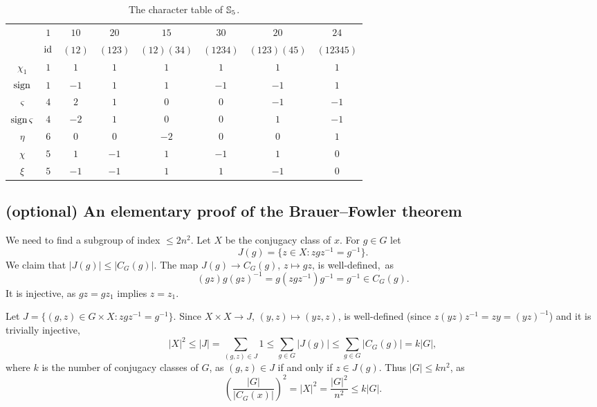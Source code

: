 \begin{table}[h]
    \caption{The character table of $\mathbb{S}_5$.}
    \begin{tabular}{|c|ccccccc|}
        \hline 
        & $1$ & $10$ & $20$ & $15$ & $30$ & $20$ & $24$ \\
        & $\operatorname{id}$ & $(12)$ & $(123)$ & $(12)(34)$ & $(1234)$ & $(123)(45)$  & $(12345)$ \\
        \hline 
        $\chi_1$ & $1$ & $1$ & $1$ & $1$ & $1$ & $1$ & $1$ \\
        $\operatorname{sign}$ & $1$ & $-1$ & $1$ & $1$ & $-1$ & $-1$ & $1$ \\
        $\varsigma$ & $4$ & $2$ & $1$ & $0$ & $0$ & $-1$ & $-1$ \\
        $\operatorname{sign}\varsigma$ & $4$ & $-2$ & $1$ & $0$ & $0$ & $1$ & $-1$ \\
        $\eta$ & $6$ & $0$ & $0$ & $-2$ & $0$ & $0$ & $1$ \\
        $\chi$ & $5$ & $1$ & $-1$ & $1$ & $-1$ & $1$ & $0$ \\
        $\xi$ & $5$ & $-1$ & $-1$ & $1$ & $1$ & $-1$ & $0$ \\
        \hline 
    \end{tabular}
    \end{table}



\subsection{(optional) An elementary proof of the Brauer--Fowler theorem}

We need to find a subgroup of index $\leq 2n^2$. 
Let $X$ be the conjugacy class of $x$. For $g\in G$ let
\[
J(g)=\{z\in X:zgz^{-1}=g^{-1}\}.
\]
We claim that $|J(g)|\leq|C_G(g)|$. The map $J(g)\to C_G(g)$, $z\mapsto gz$, 
is well-defined,~as 
\[
(gz)g(gz)^{-1}=g(zgz^{-1})g^{-1}=g^{-1}\in C_G(g).
\]
It is injective, as $gz=gz_1$ implies $z=z_1$.

Let $J=\{(g,z)\in G\times X:zgz^{-1}=g^{-1}\}$.  
Since $X\times X\to J$, $(y,z)\mapsto (yz,z)$, 
is well-defined (since $z(yz)z^{-1}=zy=(yz)^{-1}$) and
it is trivially injective, 
\[
|X|^2\leq |J|=\sum_{(g,z)\in J}1\leq\sum_{g\in G}|J(g)|
\leq\sum_{g\in G}|C_G(g)|=k|G|,
\]
where $k$ is the number of conjugacy classes of $G$, 
as $(g,z)\in J$ if and only if $z\in J(g)$. Thus $|G|\leq kn^2$, as
\[
\left(\frac{|G|}{|C_G(x)|}\right)^2=|X|^2=\frac{|G|^2}{n^2}\leq k|G|.
\]

